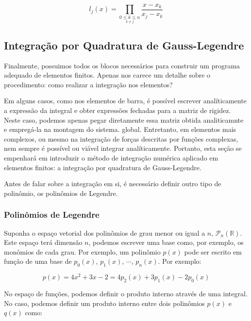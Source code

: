         \begin{equation*}
            l_j(x) = \prod_{\underset{k \neq j}{0\leq k \leq n}} \frac{x-x_k}{x_j-x_k}
        \end{equation*}

    \subsection{Integração por Quadratura de Gauss-Legendre}
    \label{sec:integracao1D}

        Finalmente, possuimos todos os blocos necessários para construir um programa adequado de elementos finitos. Apenas nos carece um detalhe sobre o procedimento: como realizar a integração nos elementos?

        Em alguns casos, como nos elementos de barra, é possível escrever analíticamente a expressão da integral e obter expressões fechadas para a matriz de rigidez. Neste caso, podemos apenas pegar diretamente essa matriz obtida analiticamnte e empregá-la na montagem do sistema. global. Entretanto, em elementos mais complexos, ou mesmo na integração de forças descritas por funções complexas, nem sempre é possível ou viável integrar analíticamente. Portanto, esta seção se empenhará em introduzir o método de integração numérica aplicado em elementos finitos: a integração por quadratura de Gauss-Legendre.

        Antes de falar sobre a integração em si, é necessário definir outro tipo de polinômio, os polinômios de Legendre.



        \subsubsection{Polinômios de Legendre}

        Suponha o espaço vetorial dos polinômios de grau menor ou igual a $n$, $\mathcal{P}_n(\mathbb{R})$. Este espaço terá dimensão $n$, podemos escrever uma base como, por exemplo, os monômios de cada grau. Por exemplo, um polinômio $p(x)$ pode ser escrito em função de uma base de $p_0(x)$, $p_1(x)$, $\cdots$, $p_n(x)$. Por exemplo:

        \begin{equation}
            p(x) = 4x^2 + 3x - 2 = 4p_2(x) + 3p_1(x) - 2p_0(x)
        \end{equation}

        No espaço de funções, podemos definir o produto interno através de uma integral. No caso, podemos definir um produto interno entre dois polinômios $p(x)$ e $q(x)$ como:


